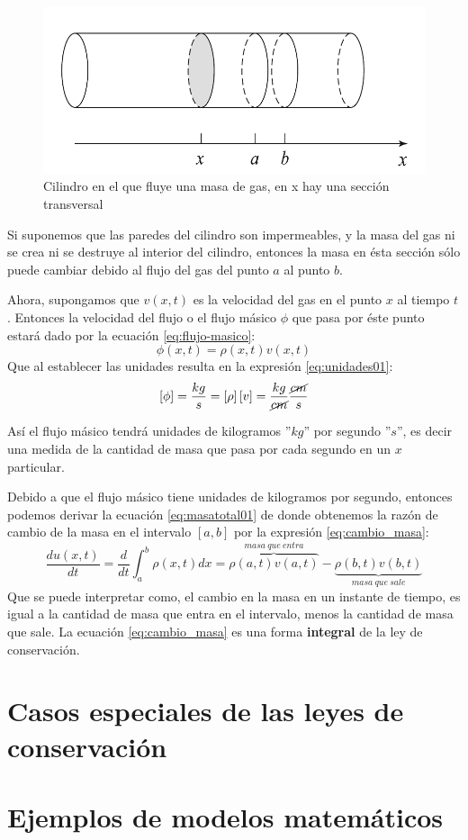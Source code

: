 \begin{figure}\label{fig:cilindro01}
    \centering
    \includegraphics[scale=0.5]{images/cilindro01}
    \caption{Cilindro en el que fluye una masa de gas, en x hay una sección transversal}
\end{figure}

Si suponemos que las paredes del cilindro son impermeables, y la masa del gas ni se crea ni se destruye
al interior del cilindro, entonces la masa en ésta sección sólo puede cambiar debido al flujo del gas
del punto $a$ al punto $b$.

Ahora, supongamos que $v(x,t)$ es la velocidad del gas en el punto $x$ al tiempo $t$.  Entonces la 
velocidad del flujo o el flujo másico $\phi$ que pasa por éste punto estará dado por la ecuación 
\eqref{eq:flujo-masico}:
\begin{equation}\label{eq:flujo-masico}
    \phi(x,t) = \rho(x,t)v(x,t)
\end{equation}
Que al establecer las unidades resulta en la expresión \eqref{eq:unidades01}:
\begin{equation}\label{eq:unidades01}
    \left[\phi\right]=\frac{kg}{s} = \left[\rho\right]\left[v\right]= \frac{kg}{\cancel{cm}}\frac{\cancel{cm}}{s}
\end{equation}

Así el flujo másico tendrá unidades de kilogramos ''$kg$'' por segundo ''$s$'', es decir una medida de la 
cantidad de masa que pasa por cada segundo en un $x$ particular.

Debido a que el flujo másico tiene unidades de kilogramos por segundo, entonces podemos derivar la 
ecuación \eqref{eq:masatotal01} de donde obtenemos la razón de cambio de la masa en el intervalo
$[a,b]$ por la expresión \eqref{eq:cambio_masa}:
\begin{equation}\label{eq:cambio_masa}
    \frac{d u(x,t)}{dt} = \frac{d}{dt}\int_a^b\rho(x,t)dx=\overbrace{\rho(a,t)v(a,t)}^{masa\ que\ entra}
    -\underbrace{\rho(b,t)v(b,t)}_{masa\ que\ sale}
\end{equation}
Que se puede interpretar como, el cambio en la masa en un instante de tiempo, es igual a la cantidad 
de masa que entra en el intervalo, menos la cantidad de masa que sale. La ecuación \eqref{eq:cambio_masa}
es una forma \textbf{integral} de la ley de conservación.
\section{Casos especiales de las leyes de conservación}

\section{Ejemplos de modelos matemáticos}


